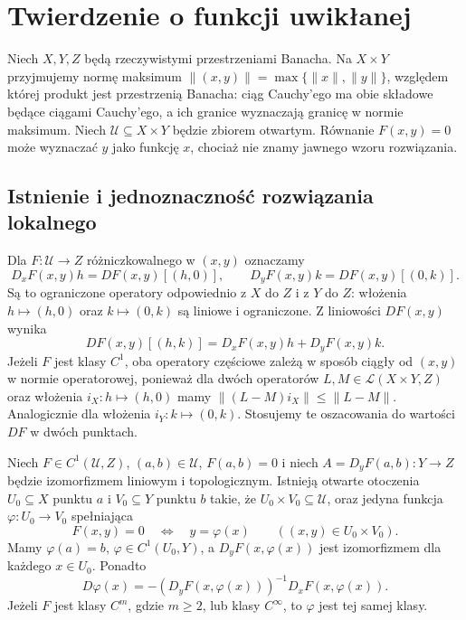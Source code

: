 \chapter{Twierdzenie o funkcji uwikłanej}
\label{ma2:ch:implicit-function}

Niech $X,Y,Z$ będą rzeczywistymi przestrzeniami Banacha.
Na $X\times Y$ przyjmujemy normę maksimum
$\|(x,y)\|=\max\{\|x\|,\|y\|\}$, względem której
produkt jest przestrzenią Banacha: ciąg Cauchy'ego ma
obie składowe będące ciągami Cauchy'ego, a ich granice
wyznaczają granicę w normie maksimum. Niech
$\mathcal U\subseteq X\times Y$ będzie zbiorem otwartym.
Równanie $F(x,y)=0$ może wyznaczać $y$ jako funkcję $x$,
chociaż nie znamy jawnego wzoru rozwiązania.

\section{Istnienie i jednoznaczność rozwiązania lokalnego}

Dla $F:\mathcal U\to Z$ różniczkowalnego w $(x,y)$ oznaczamy
\[
 D_xF(x,y)h=DF(x,y)[(h,0)],\qquad
 D_yF(x,y)k=DF(x,y)[(0,k)].
\]
Są to ograniczone operatory odpowiednio z $X$ do $Z$
i z $Y$ do $Z$: włożenia $h\mapsto(h,0)$ oraz
$k\mapsto(0,k)$ są liniowe i ograniczone.
Z liniowości $DF(x,y)$ wynika
\[
 DF(x,y)[(h,k)]=D_xF(x,y)h+D_yF(x,y)k.
\]
Jeżeli $F$ jest klasy $C^1$, oba operatory częściowe
zależą w sposób ciągły od $(x,y)$ w normie operatorowej,
ponieważ dla dwóch operatorów $L,M\in\mathcal L(X\times Y,Z)$
oraz włożenia $i_X:h\mapsto(h,0)$ mamy
$\|(L-M)i_X\|\le\|L-M\|$.
Analogicznie dla włożenia $i_Y:k\mapsto(0,k)$.
Stosujemy te oszacowania do wartości $DF$ w dwóch punktach.

\begin{twierdzenie}
\label{ma2:thm:implicit-function}
Niech $F\in C^1(\mathcal U,Z)$, $(a,b)\in\mathcal U$,
$F(a,b)=0$ i niech $A=D_yF(a,b):Y\to Z$ będzie
izomorfizmem liniowym i topologicznym.
Istnieją otwarte otoczenia $U_0\subseteq X$ punktu $a$
i $V_0\subseteq Y$ punktu $b$ takie, że
$U_0\times V_0\subseteq\mathcal U$, oraz jedyna funkcja
$\varphi:U_0\to V_0$ spełniająca
\[
 F(x,y)=0\quad\Longleftrightarrow\quad y=\varphi(x)
 \qquad ((x,y)\in U_0\times V_0).
\]
Mamy $\varphi(a)=b$, $\varphi\in C^1(U_0,Y)$,
a $D_yF(x,\varphi(x))$ jest izomorfizmem dla każdego $x\in U_0$.
Ponadto
\[
 D\varphi(x)=-(D_yF(x,\varphi(x)))^{-1}
                  D_xF(x,\varphi(x)).
\]
Jeżeli $F$ jest klasy $C^m$, gdzie $m\ge2$,
lub klasy $C^\infty$, to $\varphi$ jest tej samej klasy.
\end{twierdzenie}

